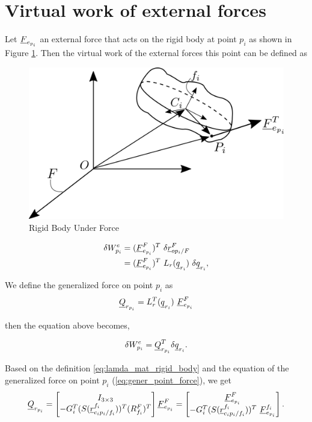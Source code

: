 \section{Virtual work of external forces}
Let $\vecd{F}_{e_{p_i}}$ an external force that acts on the rigid body 
at point $p_i$ as shown in Figure \ref{fig:rigid_body_forces}.
Then the virtual work of the external forces this point can be defined as 

\begin{figure}[h]
    \centering\includegraphics[scale=0.2]{Images/rigid_body_diagram_force.png}
    \caption{Rigid Body Under Force}
    \label{fig:rigid_body_forces}
\end{figure}

\begin{align*}
    \delta W^{e}_{p_i} &= (\vecd{F}^{F}_{e_{p_i}})^{T}\ \delta \pvec{r}{op_{i}}{F}{F}\\ 
    &= (\vecd{F}^{F}_{e_{p_i}})^{T}\ L_{r}(\vecd{q}_{r_{i}})\ \delta \vecd{q}_{r_{i}},
\end{align*}

We define the generalized force on point $p_i$ as 
\begin{equation}
    \vecd{Q}_{r_{p_i}} = L^{T}_{r}(\vecd{q}_{r_{i}})\ \vecd{F}^{F}_{e_{p_i}}
    \label{eq:gener_point_force}
\end{equation}

then the equation above becomes,

\begin{equation}
    \delta W^{e}_{p_i} = \vecd{Q}^{T}_{r_{p_i}} \delta \vecd{q}_{r_{i}}.
    \label{eq:virtual_external_work_pi}
\end{equation}

Based on the definition \eqref{eq:lamda_mat_rigid_body} and the equation of 
the generalized force on point $p_i$ (\eqref{eq:gener_point_force}),
we get
\[
    \vecd{Q}_{r_{p_i}} = 
    \begin{bmatrix}
        I_{3 \times 3} \\ -G^{T}_{i} (S(\pvec{r}{c_{i}p_{i}}{f_{i}}{f_{i}}))^{T}
        (\rot{R}{f_{i}}{F})^{T}
    \end{bmatrix} \vecd{F}^{F}_{e_{p_i}} = 
    \begin{bmatrix}
            \vecd{F}^{F}_{e_{p_i}} \\ -G^{T}_{i} (S(\pvec{r}{c_{i}p_{i}}{f_{i}}{f_{i}}))^{T}
            \ \vecd{F}^{f_i}_{e_{p_i}}
        \end{bmatrix}.
\]

